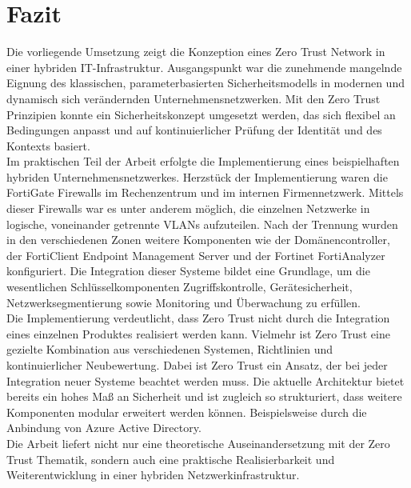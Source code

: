 \documentclass[lettersize,journal]{IEEEtran}
\begin{document}
\section{Fazit}
Die vorliegende Umsetzung zeigt die Konzeption eines Zero Trust Network in einer hybriden IT-Infrastruktur. Ausgangspunkt war die zunehmende mangelnde Eignung des klassischen, parameterbasierten Sicherheitsmodells in modernen und dynamisch sich verändernden Unternehmensnetzwerken. Mit den Zero Trust Prinzipien konnte ein Sicherheitskonzept umgesetzt werden, das sich flexibel an Bedingungen anpasst und auf kontinuierlicher Prüfung der Identität und des Kontexts basiert.\\
Im praktischen Teil der Arbeit erfolgte die Implementierung eines beispielhaften hybriden Unternehmensnetzwerkes. Herzstück der Implementierung waren die FortiGate Firewalls im Rechenzentrum und im internen Firmennetzwerk. Mittels dieser Firewalls war es unter anderem möglich, die einzelnen Netzwerke in logische, voneinander getrennte VLANs aufzuteilen. Nach der Trennung wurden in den verschiedenen Zonen weitere Komponenten wie der Domänencontroller, der FortiClient Endpoint Management Server und der Fortinet FortiAnalyzer konfiguriert. Die Integration dieser Systeme bildet eine Grundlage, um die wesentlichen Schlüsselkomponenten Zugriffskontrolle, Gerätesicherheit, Netzwerksegmentierung sowie Monitoring und Überwachung zu erfüllen.\\
Die Implementierung verdeutlicht, dass Zero Trust nicht durch die Integration eines einzelnen Produktes realisiert werden kann. Vielmehr ist Zero Trust eine gezielte Kombination aus verschiedenen Systemen, Richtlinien und kontinuierlicher Neubewertung. Dabei ist Zero Trust ein Ansatz, der bei jeder Integration neuer Systeme beachtet werden muss. Die aktuelle Architektur bietet bereits ein hohes Maß an Sicherheit und ist zugleich so strukturiert, dass weitere Komponenten modular erweitert werden können. Beispielsweise durch die Anbindung von Azure Active Directory.\\
Die Arbeit liefert nicht nur eine theoretische Auseinandersetzung mit der Zero Trust Thematik, sondern auch eine praktische Realisierbarkeit und Weiterentwicklung in einer hybriden Netzwerkinfrastruktur.


\printbibliography[title=Literaturverzeichnis]
\end{document}
